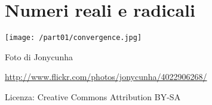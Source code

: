 \part{Numeri reali e radicali}

\texttt{[image: /part01/convergence.jpg]}
 \begin{center}
 Foto di Jonycunha\par
 \url{http://www.flickr.com/photos/jonycunha/4022906268/}\par
 Licenza: Creative Commons Attribution BY-SA\par
 \end{center}
\clearpage
\cleardoublepage